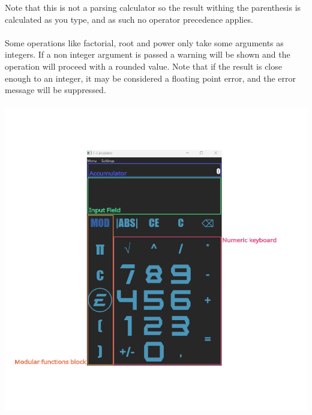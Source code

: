 \documentclass{article}
\begin{document}
	Note that this is not a parsing calculator so the result withing the parenthesis is calculated as you type, and as such no operator precedence applies.\\
	\\
	Some operations like factorial, root and power only take some arguments as integers.
	If a non integer argument is passed a warning will be shown and the operation will proceed with a rounded value. Note that if the result is close enough to an integer, it may be considered a floating point error, and the error message will be suppressed.\\
	\\
	\includegraphics[width=\textwidth]{kalkulacka_comment}
	
\end{document}
